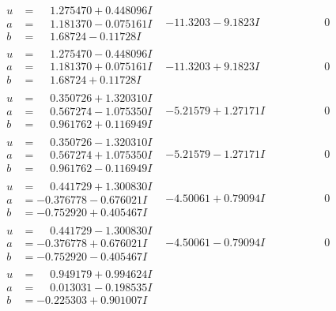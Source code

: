 \documentclass[1p]{elsarticle_modified}
\theoremstyle{definition}
\begin{document}
$$\begin{array}{c|c|c}
\begin{aligned}
u &= \phantom{-}1.275470 + 0.448096 I \\
a &= \phantom{-}1.181370 - 0.075161 I \\
b &= \phantom{-}1.68724 - 0.11728 I\end{aligned}
 & -11.3203 - 9.1823 I & \phantom{-0.000000 } 0 \\ \hline\begin{aligned}
u &= \phantom{-}1.275470 - 0.448096 I \\
a &= \phantom{-}1.181370 + 0.075161 I \\
b &= \phantom{-}1.68724 + 0.11728 I\end{aligned}
 & -11.3203 + 9.1823 I & \phantom{-0.000000 } 0 \\ \hline\begin{aligned}
u &= \phantom{-}0.350726 + 1.320310 I \\
a &= \phantom{-}0.567274 - 1.075350 I \\
b &= \phantom{-}0.961762 + 0.116949 I\end{aligned}
 & -5.21579 + 1.27171 I & \phantom{-0.000000 } 0 \\ \hline\begin{aligned}
u &= \phantom{-}0.350726 - 1.320310 I \\
a &= \phantom{-}0.567274 + 1.075350 I \\
b &= \phantom{-}0.961762 - 0.116949 I\end{aligned}
 & -5.21579 - 1.27171 I & \phantom{-0.000000 } 0 \\ \hline\begin{aligned}
u &= \phantom{-}0.441729 + 1.300830 I \\
a &= -0.376778 - 0.676021 I \\
b &= -0.752920 + 0.405467 I\end{aligned}
 & -4.50061 + 0.79094 I & \phantom{-0.000000 } 0 \\ \hline\begin{aligned}
u &= \phantom{-}0.441729 - 1.300830 I \\
a &= -0.376778 + 0.676021 I \\
b &= -0.752920 - 0.405467 I\end{aligned}
 & -4.50061 - 0.79094 I & \phantom{-0.000000 } 0 \\ \hline\begin{aligned}
u &= \phantom{-}0.949179 + 0.994624 I \\
a &= \phantom{-}0.013031 - 0.198535 I \\
b &= -0.225303 + 0.901007 I\end{aligned}

\end{array}$$
\end{document}
